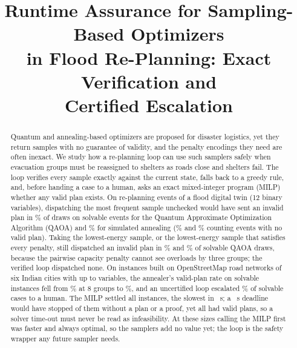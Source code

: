\documentclass[conference]{IEEEtran}
\begin{document}
\title{Runtime Assurance for Sampling-Based Optimizers\\
in Flood Re-Planning: Exact Verification and\\
Certified Escalation}

\author{
}

\maketitle

\begin{abstract}
Quantum and annealing-based optimizers are proposed for disaster logistics, yet they return samples with no guarantee of validity, and the penalty encodings they need are often inexact. We study how a re-planning loop can use such samplers safely when evacuation groups must be reassigned to shelters as roads close and shelters fail. The loop verifies every sample exactly against the current state, falls back to a greedy rule, and, before handing a case to a human, asks an exact mixed-integer program (MILP) whether any valid plan exists. On \TwinEvents{} re-planning events of a flood digital twin (12 binary variables), dispatching the most frequent sample unchecked would have sent an invalid plan in \TwinRawFeasQ\% of draws on solvable events for the Quantum Approximate Optimization Algorithm (QAOA) and \TwinRawFeasSA\% for simulated annealing (\TwinRawQ\% and \TwinRawSA\% counting events with no valid plan). Taking the lowest-energy sample, or the lowest-energy sample that satisfies every penalty, still dispatched an invalid plan in \BaseLowQSol\% and \BasePfQSol\% of solvable QAOA draws, because the pairwise capacity penalty cannot see overloads by three groups; the verified loop dispatched none. On \CityN{} instances built on OpenStreetMap road networks of six Indian cities with up to \CityMaxVars{} variables, the annealer's valid-plan rate on solvable instances fell from \CitySAFoundEight\% at 8 groups to \CitySAFoundThirtyTwo\%, and an uncertified loop escalated \CityFalseEsc\% of solvable cases to a human. The MILP settled all \CityN{} instances, the slowest in \MilpSlowS~s; a \DeadlineS~s deadline would have stopped \DeadlineN{} of them without a plan or a proof, yet all had valid plans, so a solver time-out must never be read as infeasibility. At these sizes calling the MILP first was faster and always optimal, so the samplers add no value yet; the loop is the safety wrapper any future sampler needs.
\end{abstract}
\end{document}
